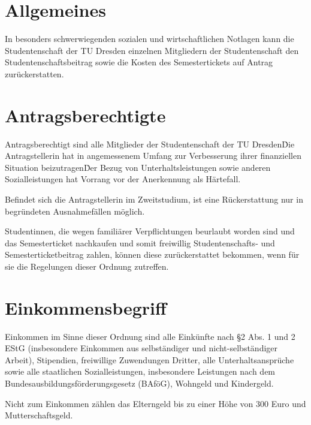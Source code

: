 \setcounter{section}{0}
\begin{multicols}{2}



\section{Allgemeines}

\Abs \Satz In besonders schwerwiegenden sozialen und wirtschaftlichen Notlagen kann die Studentenschaft der TU Dresden einzelnen Mitgliedern der Studentenschaft den Studentenschaftsbeitrag sowie die Kosten des Semestertickets auf Antrag zurückerstatten. 


\section{Antragsberechtigte}

\Abs \Satz Antragsberechtigt sind alle Mitglieder der Studentenschaft der TU Dresden\. Die Antragstellerin hat in angemessenem Umfang zur Verbesserung ihrer finanziellen Situation beizutragen\. Der Bezug von Unterhaltsleistungen sowie anderen Sozialleistungen hat Vorrang vor der Anerkennung als Härtefall.

\Abs \Satz Befindet sich die Antragstellerin im Zweitstudium, ist eine Rückerstattung nur in begründeten Ausnahmefällen möglich.

\Abs \Satz Studentinnen, die wegen familiärer Verpflichtungen beurlaubt worden sind und das Semesterticket nachkaufen und somit freiwillig Studentenschafts- und Semesterticketbeitrag zahlen, können diese zurückerstattet bekommen, wenn für sie die Regelungen dieser Ordnung zutreffen.


\section{Einkommensbegriff}

\Abs \Satz Einkommen im Sinne dieser Ordnung sind alle Einkünfte nach §2 Abs. 1 und 2 EStG (insbesondere Einkommen aus selbständiger und nicht-selbständiger Arbeit), Stipendien, freiwillige Zuwendungen Dritter, alle Unterhaltsansprüche sowie alle staatlichen Sozialleistungen, insbesondere Leistungen nach dem Bundesausbildungsförderungsgesetz (BAföG), Wohngeld und Kindergeld.

\Abs \Satz Nicht zum Einkommen zählen das Elterngeld bis zu einer Höhe von 300 Euro und Mutterschaftsgeld.


\end{multicols}
